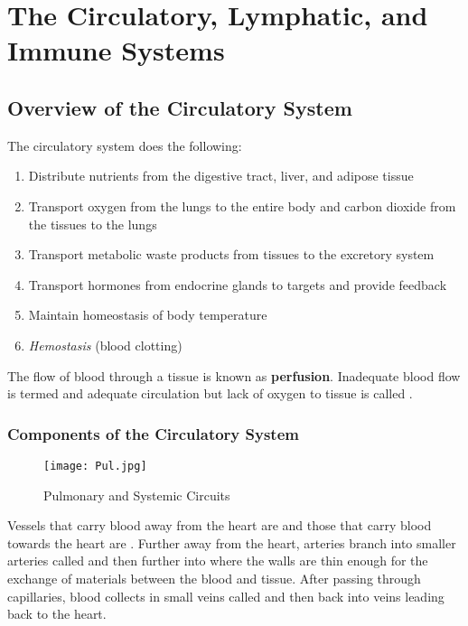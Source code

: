 \documentclass[../Bio_chemistryReview.tex]{subfiles}
\begin{document}
\chapter{The Circulatory, Lymphatic, and Immune Systems}
\section{Overview of the Circulatory System}
The circulatory system does the following:
\begin{enumerate}
  \item Distribute nutrients from the digestive tract, liver, and adipose tissue
  \item Transport oxygen from the lungs to the entire body and carbon dioxide
    from the tissues to the lungs
  \item Transport metabolic waste products from tissues to the excretory system
  \item Transport hormones from endocrine glands to targets and provide feedback
  \item Maintain homeostasis of body temperature
  \item \textit{Hemostasis} (blood clotting)
\end{enumerate}
The flow of blood through a tissue is known as \textbf{perfusion}. Inadequate
blood flow is termed  and adequate circulation but lack of
oxygen to tissue is called .

\subsection{Components of the Circulatory System}
\begin{wrapfigure}{r}{0.4\textwidth}
  \centering
  \vspace{-11pt}
  \texttt{[image: Pul.jpg]}
  \caption{Pulmonary and Systemic Circuits}
  \label{fig:pul}
\end{wrapfigure}
Vessels that carry blood away from the heart are  and those
that carry blood towards the heart are . Further away from the
heart, arteries branch into smaller arteries called  and
then further into  where the walls are thin enough for the
exchange of materials between the blood and tissue. After passing through
capillaries, blood collects in small veins called  and then
back into veins leading back to the heart.\par
\end{document}
